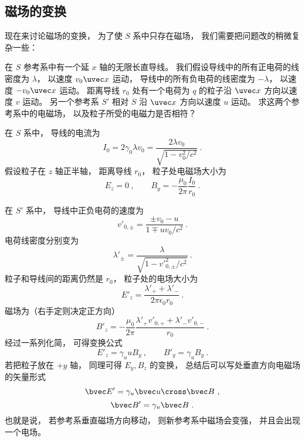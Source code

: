 
\subsection{磁场的变换}
现在来讨论磁场的变换， 为了使 $S$ 系中只存在磁场， 我们需要把问题改的稍微复杂一些：

在 $S$ 参考系中有一个延 $x$ 轴的无限长直导线。 我们假设导线中的所有正电荷的线密度为 $\lambda$， 以速度 $v_0\uvec x$ 运动， 导线中的所有负电荷的线密度为 $-\lambda$，  以速度 $-v_0\uvec x$ 运动。 距离导线 $r_0$ 处有一个电荷为 $q$ 的粒子沿 $\uvec x$ 方向以速度 $v$ 运动。 另一个参考系 $S'$ 相对 $S$ 沿 $\uvec x$ 方向以速度 $u$ 运动。 求这两个参考系中的电磁场， 以及粒子所受的电磁力是否相符？

在 $S$ 系中， 导线的电流为
\begin{equation}
I_0 = 2 \gamma_0 \lambda v_0 = \frac{2 \lambda v_0}{\sqrt{1 - v_0^2/c^2}}~.
\end{equation}
假设粒子在 $z$ 轴正半轴， 距离导线 $r_0$， 粒子处电磁场大小为
\begin{equation}
E_z = 0 ~,\qquad B_y = -\frac{\mu_0}{2\pi} \frac{I_0}{r_0}~.
\end{equation}

在 $S'$ 系中， 导线中正负电荷的速度为
\begin{equation}
v'_{0, \pm} = \frac{\pm v_0-u}{1 \mp uv_0/c^2}~.
\end{equation}
电荷线密度分别变为
\begin{equation}
\lambda'_\pm = \frac{\lambda}{\sqrt{1 - v'^2_{0,\pm}/c^2}}~.
\end{equation}
粒子和导线间的距离仍然是 $r_0$， 粒子处的电场大小为
\begin{equation}
E'_z = \frac{\lambda'_+ + \lambda'_-}{2 \pi \epsilon_{0} r_0}~.
\end{equation}
磁场为（右手定则决定正方向）
\begin{equation}
B'_z = -\frac{\mu_0}{2\pi} \frac{\lambda'_+ v'_{0,+} + \lambda'_- v'_{0,-}}{r_0}~.
\end{equation}
经过一系列化简， 可得变换公式
\begin{equation}
E'_z = \gamma_u u B_y~,
\qquad
B'_y = \gamma_u B_y~.
\end{equation}
若把粒子放在 $+y$ 轴， 同理可得 $E_y, B_z$ 的变换， 总结后可以写处垂直方向电磁场的矢量形式
\begin{equation}\label{eq_EMRef_3}
\bvec E' = \gamma_u \bvec u \cross \bvec B~,
\end{equation}
\begin{equation}\label{eq_EMRef_4}
\bvec B' = \gamma_u \bvec B~.
\end{equation}
也就是说， 若参考系垂直磁场方向移动， 则新参考系中磁场会变强， 并且会出现一个电场。

